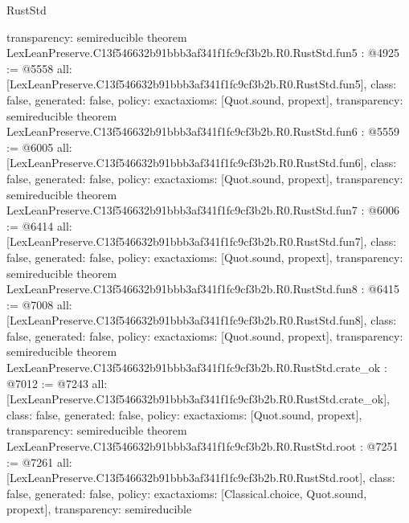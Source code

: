 \begin{lexlean}{RustStd}
\begin{coremodule}
{  transparency: semireducible
}
theorem LexLeanPreserve.C13f546632b91bbb3af341f1fc9cf3b2b.R0.RustStd.fun5 : @4925 := @5558 {
  all: [LexLeanPreserve.C13f546632b91bbb3af341f1fc9cf3b2b.R0.RustStd.fun5],
  class: false,
  generated: false,
  policy: exact{axioms: [Quot.sound, propext]},
  transparency: semireducible
}
theorem LexLeanPreserve.C13f546632b91bbb3af341f1fc9cf3b2b.R0.RustStd.fun6 : @5559 := @6005 {
  all: [LexLeanPreserve.C13f546632b91bbb3af341f1fc9cf3b2b.R0.RustStd.fun6],
  class: false,
  generated: false,
  policy: exact{axioms: [Quot.sound, propext]},
  transparency: semireducible
}
theorem LexLeanPreserve.C13f546632b91bbb3af341f1fc9cf3b2b.R0.RustStd.fun7 : @6006 := @6414 {
  all: [LexLeanPreserve.C13f546632b91bbb3af341f1fc9cf3b2b.R0.RustStd.fun7],
  class: false,
  generated: false,
  policy: exact{axioms: [Quot.sound, propext]},
  transparency: semireducible
}
theorem LexLeanPreserve.C13f546632b91bbb3af341f1fc9cf3b2b.R0.RustStd.fun8 : @6415 := @7008 {
  all: [LexLeanPreserve.C13f546632b91bbb3af341f1fc9cf3b2b.R0.RustStd.fun8],
  class: false,
  generated: false,
  policy: exact{axioms: [Quot.sound, propext]},
  transparency: semireducible
}
theorem LexLeanPreserve.C13f546632b91bbb3af341f1fc9cf3b2b.R0.RustStd.crate_ok : @7012 := @7243 {
  all: [LexLeanPreserve.C13f546632b91bbb3af341f1fc9cf3b2b.R0.RustStd.crate_ok],
  class: false,
  generated: false,
  policy: exact{axioms: [Quot.sound, propext]},
  transparency: semireducible
}
theorem LexLeanPreserve.C13f546632b91bbb3af341f1fc9cf3b2b.R0.RustStd.root : @7251 := @7261 {
  all: [LexLeanPreserve.C13f546632b91bbb3af341f1fc9cf3b2b.R0.RustStd.root],
  class: false,
  generated: false,
  policy: exact{axioms: [Classical.choice, Quot.sound, propext]},
  transparency: semireducible
}


\end{coremodule}
\end{lexlean}
